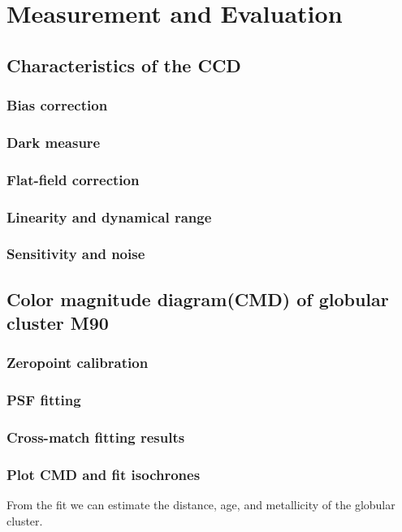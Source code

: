 \section{Measurement and Evaluation}
\subsection{Characteristics of the CCD}
\subsubsection{Bias correction}
\subsubsection{Dark measure}
\subsubsection{Flat-field correction}
\subsubsection{Linearity and dynamical range}
\subsubsection{Sensitivity and noise}
\subsection{Color magnitude diagram(CMD) of globular cluster M90}
\subsubsection{Zeropoint calibration}
\subsubsection{PSF fitting}
\subsubsection{Cross-match fitting results}
\subsubsection{Plot CMD and fit isochrones}
From the fit we can estimate the distance, age, and metallicity of the globular cluster.